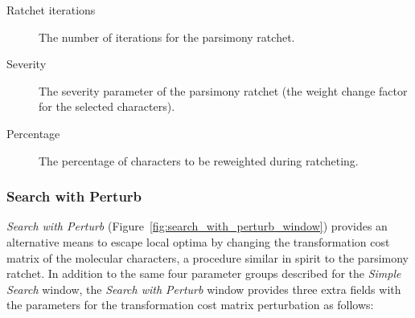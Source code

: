 \begin{description}
    \item[Ratchet iterations] The number of iterations for the parsimony
        ratchet.
    \item[Severity] The severity parameter of the parsimony ratchet (the weight
        change factor for the selected characters).
    \item[Percentage] The percentage of characters to be reweighted during ratcheting.
\end{description}

\subsubsection{Search with Perturb}

\emph{Search with Perturb} (Figure~\ref{fig:search_with_perturb_window}) provides an alternative means to escape local optima by changing the transformation cost matrix of the molecular characters, a procedure similar in spirit to the parsimony ratchet. In addition to the
same four parameter groups described for the \emph{Simple Search} window, the \emph{Search
with Perturb} window provides three extra fields with the parameters for the
transformation cost matrix perturbation as follows:

